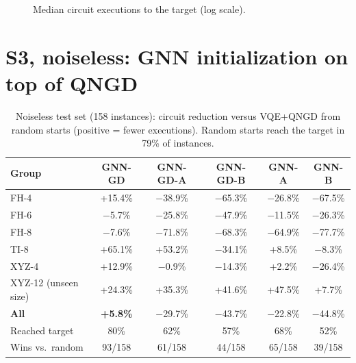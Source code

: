 \documentclass{ssnreview}
\newcommand{\Rplus}{\textcolor{green!50!black}}
\newcommand{\Rminus}{\textcolor{red!70!black}}
\begin{document}
\begin{figure}[H]
\centering
{}
\caption{Median circuit executions to the target (log scale).}\label{fig:s1s2}
\end{figure}

\section{S3, noiseless: GNN initialization on top of QNGD}

\begin{table}[H]
\centering
\caption{Noiseless test set (158 instances): circuit reduction versus VQE+QNGD from random
starts (positive = fewer executions). Random starts reach the target in 79\% of instances.}\label{tab:noiseless}
\small
\begin{tabular}{lccccc}
\toprule
Group & GNN-GD & GNN-GD-A & GNN-GD-B & GNN-A & GNN-B \\
\midrule
FH-4   & \Rplus{+15.4\%}  & \Rminus{$-$38.9\%} & \Rminus{$-$65.3\%} & \Rminus{$-$26.8\%} & \Rminus{$-$67.5\%} \\
FH-6   & \Rminus{$-$5.7\%} & \Rminus{$-$25.8\%} & \Rminus{$-$47.9\%} & \Rminus{$-$11.5\%} & \Rminus{$-$26.3\%} \\
FH-8   & \Rminus{$-$7.6\%} & \Rminus{$-$71.8\%} & \Rminus{$-$68.3\%} & \Rminus{$-$64.9\%} & \Rminus{$-$77.7\%} \\
TI-8   & \Rplus{+65.1\%}  & \Rplus{+53.2\%}  & \Rminus{$-$34.1\%} & \Rplus{+8.5\%}   & \Rminus{$-$8.3\%} \\
XYZ-4  & \Rplus{+12.9\%}  & \Rminus{$-$0.9\%} & \Rminus{$-$14.3\%} & \Rplus{+2.2\%}   & \Rminus{$-$26.4\%} \\
XYZ-12 (unseen size) & \Rplus{+24.3\%} & \Rplus{+35.3\%} & \Rplus{+41.6\%} & \Rplus{+47.5\%} & \Rplus{+7.7\%} \\
\midrule
\textbf{All} & \textbf{\Rplus{+5.8\%}} & \Rminus{$-$29.7\%} & \Rminus{$-$43.7\%} & \Rminus{$-$22.8\%} & \Rminus{$-$44.8\%} \\
Reached target & 80\% & 62\% & 57\% & 68\% & 52\% \\
Wins vs.\ random & 93/158 & 61/158 & 44/158 & 65/158 & 39/158 \\
\bottomrule
\end{tabular}
\end{table}
\end{document}
